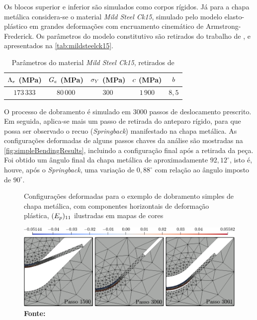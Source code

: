 \documentclass[Tese.tex]{subfiles}
\begin{document}
Os blocos superior e inferior são simulados como corpos rígidos. Já para a chapa metálica considera-se o material \emph{Mild Steel Ck15}, simulado pelo modelo elasto-plástico em grandes deformações com encruamento cinemático de Armstrong-Frederick. Os parâmetros do modelo constitutivo são retirados do trabalho de , e apresentados na \autoref{tab:mildsteelck15}.

\begin{table}[h]
	\centering
	\caption{Parâmetros do material \emph{Mild Steel Ck15}, retirados de }
	\label{tab:mildsteelck15}
	{\tabulinesep=1.5mm
		\begin{tabu}{ccccc}
			\hline
			$\Lambda_e$ (MPa) & $G_e$ (MPa) & $\sigma_Y$ (MPa) & $c$ (MPa) & $b$ \\ \hline
			$173\,333$ & $80\,000$ & $300$ & $1\,900$ & $8,5$ \\ \hline	
		\end{tabu}	
	}
\end{table}

O processo de dobramento é simulado em 3000 passos de deslocamento prescrito. Em seguida, aplica-se mais um passo de retirada do anteparo rígido, para que possa ser observado o recuo (\emph{Springback}) manifestado na chapa metálica. As configurações deformadas de alguns passos chaves da análise são mostradas na \autoref{fig:simpleBendingResults}, incluindo a configuração final após a retirada da peça. Foi obtido um ângulo final da chapa metálica de aproximadamente $92,12^{\circ}$, isto é, houve, após o \emph{Springback}, uma variação de $0,88^{\circ}$ com relação ao ângulo imposto de $90^{\circ}$. 

\begin{figure}[!htb]
	\centering
	\caption{Configurações deformadas para o exemplo de dobramento simples de chapa metálica, com componentes horizontais de deformação plástica, $({E}_p)_{11}$ ilustradas em mapas de cores}
	\label{fig:simpleBendingResults}
	\includegraphics[scale=0.47]{Figuras/ExemplosContato/SimpleBendingResults.png}
	\caption*{\textbf{Fonte:} }
\end{figure}
\end{document}
